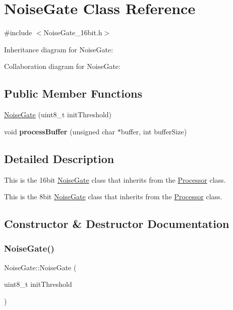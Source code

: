 \hypertarget{classNoiseGate}{}\section{Noise\+Gate Class Reference}
\label{classNoiseGate}


{\ttfamily \#include $<$Noise\+Gate\+\_\+16bit.\+h$>$}



Inheritance diagram for Noise\+Gate\+:


Collaboration diagram for Noise\+Gate\+:
\subsection*{Public Member Functions}
\begin{DoxyCompactItemize}
\item 
\hyperlink{classNoiseGate_a9a5aafbd238dbbc01eff52edd5ef29c4}{Noise\+Gate} (uint8\+\_\+t init\+Threshold)
\item 
\mbox{\label{classNoiseGate_a319f4b7d435ed4a270e695cf7c529d24}} 
void {\bfseries process\+Buffer} (unsigned char $\ast$buffer, int buffer\+Size)
\end{DoxyCompactItemize}


\subsection{Detailed Description}
This is the 16bit \hyperlink{classNoiseGate}{Noise\+Gate} class that inherits from the \hyperlink{classProcessor}{Processor} class.

This is the 8bit \hyperlink{classNoiseGate}{Noise\+Gate} class that inherits from the \hyperlink{classProcessor}{Processor} class. 

\subsection{Constructor \& Destructor Documentation}
\mbox{\label{classNoiseGate_a9a5aafbd238dbbc01eff52edd5ef29c4}} 
\subsubsection{\texorpdfstring{Noise\+Gate()}{NoiseGate()}}
{\footnotesize\ttfamily Noise\+Gate\+::\+Noise\+Gate (\begin{DoxyParamCaption}\item[{uint8\+\_\+t}]{init\+Threshold }\end{DoxyParamCaption})}

